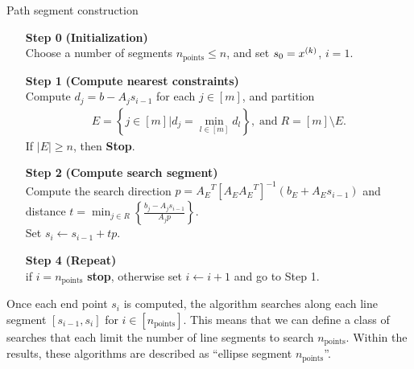 {
\begin{fullwidth}[leftmargin=0in, rightmargin=0in, width=\linewidth-0.35in]
\begin{flushleft}


\begin{algorithm}[H]
    \caption{Path segment construction}
    \label{segment_construction}
    \begin{itemize}
        \item[\textbf{Step 0}] \textbf{(Initialization)} \\
            Choose a number of segments $n_{\text{points}} \le n$, and set $s_0 = x^{(k)}$, $i=1$.
            
        \item[\textbf{Step 1}] \textbf{(Compute nearest constraints)} \\
			Compute $d_j = b - A_j s_{i-1}$ for each $j \in [m]$, and partition 
			\begin{align*}
			E = \left\{j \in [m] \bigg| d_j = \min_{l \in [m]} d_l\right\}, \; \textrm{and} \; R = [m] \setminus E.
			\end{align*}
			If $|E| \ge n$, then \textbf{Stop}.
			
            
        \item[\textbf{Step 2}] \textbf{(Compute search segment)} \\
        	Compute the search direction $p = {A_E}^T\left[A_E{A_E}^T\right]^{-1}\left(b_E + A_E s_{i-1}\right)$
        	and distance $t = \min_{j \in R} \left\{\frac{b_j - A_j s_{i-1}}{A_jp}  \right\}$. \\
        	Set $s_i \gets s_{i-1} + tp$.
        	
        \item[\textbf{Step 4}] \textbf{(Repeat)} \\
        if $i = n_{\text{points}}$ \textbf{stop}, otherwise set $i \gets i+1$ and go to Step 1.
    \end{itemize}
\end{algorithm}

\end{flushleft}
\end{fullwidth}
}



Once each end point $s_i$ is computed, the algorithm searches along each line segment $[s_{i-1}, s_i]$ for $i \in [n_{\text{points}}]$.
This means that we can define a class of searches that each limit the number of line segments to search $n_{\text{points}}$.
Within the results, these algorithms are described as ``ellipse segment $n_{\text{points}}$''.

